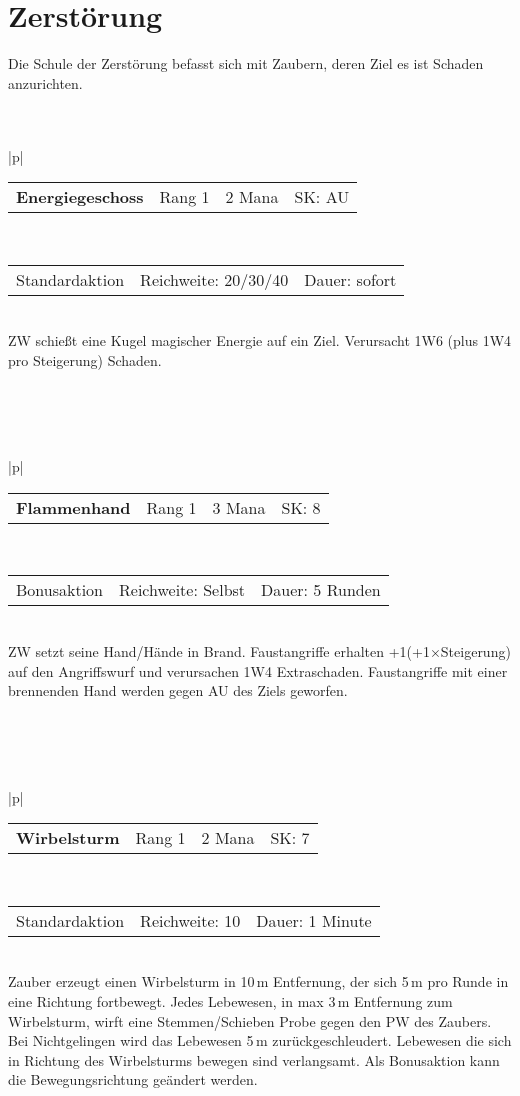 \documentclass[../../Heldenanleitung2]{subfiles}
\begin{document}
\section{Zerstörung}

Die Schule der Zerstörung befasst sich mit Zaubern, deren Ziel es ist Schaden anzurichten.
\\\\\\
\begin{tabular}{|p{\textwidth}|}
\hline
\begin{tabularx}{\textwidth}{X|X|X|X}
\textbf{Energiegeschoss} & Rang 1 & 2 Mana & SK: AU
\end{tabularx} \\ \hline
\begin{tabularx}{\textwidth}{X|X|X}
Standardaktion & Reichweite: 20/30/40 & Dauer: sofort
\end{tabularx} \\ \hline
ZW schießt eine Kugel magischer Energie auf ein Ziel. Verursacht 1W6 (plus 1W4 pro Steigerung) Schaden.
\\ \hline
\end{tabular}
\\\\\\
\begin{tabular}{|p{\textwidth}|}
\hline
\begin{tabularx}{\textwidth}{X|X|X|X}
\textbf{Flammenhand} & Rang 1 & 3 Mana & SK: 8
\end{tabularx} \\ \hline
\begin{tabularx}{\textwidth}{X|X|X}
Bonusaktion & Reichweite: Selbst & Dauer: 5 Runden
\end{tabularx} \\ \hline
ZW setzt seine Hand/Hände in Brand. Faustangriffe erhalten +1(+1$\times$Steigerung) auf den Angriffswurf und verursachen 1W4 Extraschaden. Faustangriffe mit einer brennenden Hand werden gegen AU des Ziels geworfen.
\\ \hline
\end{tabular}
\\\\\\
\begin{tabular}{|p{\textwidth}|}
\hline
\begin{tabularx}{\textwidth}{X|X|X|X}
\textbf{Wirbelsturm} & Rang 1 & 2 Mana & SK: 7
\end{tabularx} \\ \hline
\begin{tabularx}{\textwidth}{X|X|X}
Standardaktion & Reichweite: 10 & Dauer: 1 Minute
\end{tabularx} \\ \hline
Zauber erzeugt einen Wirbelsturm in 10\,m Entfernung, der sich 5\,m pro Runde in eine Richtung fortbewegt. Jedes Lebewesen, in max 3\,m Entfernung zum Wirbelsturm, wirft eine Stemmen/Schieben Probe gegen den PW des Zaubers. Bei Nichtgelingen wird das Lebewesen 5\,m zurückgeschleudert. Lebewesen die sich in Richtung des Wirbelsturms bewegen sind verlangsamt. Als Bonusaktion kann die Bewegungsrichtung geändert werden.
\\ \hline
\end{tabular}
\end{document}
